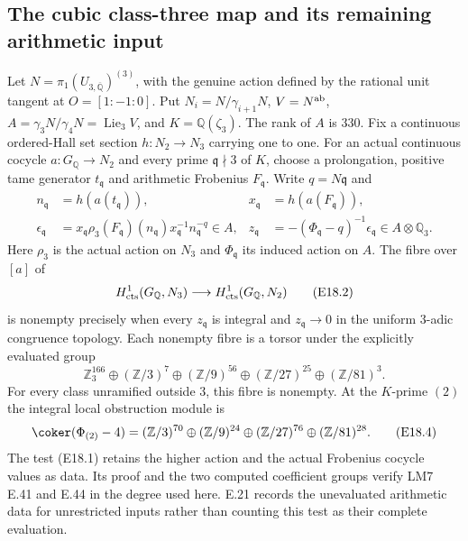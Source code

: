 \subsection{The cubic class-three map and its remaining arithmetic input}

\begin{proposition}
\label{E-class-three-criterion}
Let $N=\pi_1(U_{3,\overline{\mathbb Q}})^{(3)}$, with
the genuine action defined by the rational unit tangent
at $O=[1:-1:0]$. Put $N_i=N/\gamma_{i+1}N$,
$V=N^{\rm ab}$, $A=\gamma_3N/\gamma_4N=\operatorname{Lie}_3V$,
and $K=\mathbb Q(\zeta_3)$. The rank of $A$ is $330$.
Fix a continuous ordered-Hall set section $h:N_2\to N_3$
carrying one to one. For an actual continuous cocycle
$a:G_{\mathbb Q}\to N_2$ and every prime
$\mathfrak q\nmid3$ of $K$, choose a prolongation,
positive tame generator $t_{\mathfrak q}$ and arithmetic
Frobenius $F_{\mathfrak q}$. Write $q=N\mathfrak q$ and
\[
 \begin{aligned}
 n_{\mathfrak q}&=h(a(t_{\mathfrak q})),&
 x_{\mathfrak q}&=h(a(F_{\mathfrak q})),\\
 \epsilon_{\mathfrak q}
 &=x_{\mathfrak q}\rho_3(F_{\mathfrak q})(n_{\mathfrak q})
       x_{\mathfrak q}^{-1}n_{\mathfrak q}^{-q}\in A,&
 z_{\mathfrak q}
 &=-(\Phi_{\mathfrak q}-q)^{-1}\epsilon_{\mathfrak q}
       \in A\otimes\mathbb Q_3 .
 \end{aligned}
 \tag{E18.1}
\]
Here $\rho_3$ is the actual action on $N_3$ and
$\Phi_{\mathfrak q}$ its induced action on $A$.
The fibre over $[a]$ of
\[
 H^1_{\rm cts}(G_{\mathbb Q},N_3)
       \longrightarrow H^1_{\rm cts}(G_{\mathbb Q},N_2)
 \tag{E18.2}
\]
is nonempty precisely when every $z_{\mathfrak q}$ is
integral and $z_{\mathfrak q}\to0$ in the uniform
$3$-adic congruence topology. Each nonempty fibre is
a torsor under the explicitly evaluated group
\[
 \mathbb Z_3^{166}\oplus(\mathbb Z/3)^7
   \oplus(\mathbb Z/9)^{56}\oplus(\mathbb Z/27)^{25}
   \oplus(\mathbb Z/81)^3 .
 \tag{E18.3}
\]
For every class unramified outside $3$, this fibre
is nonempty. At the $K$-prime $(2)$ the integral
local obstruction module is
\[
 \coker(\Phi_{(2)}-4)=
 (\mathbb Z/3)^{70}\oplus(\mathbb Z/9)^{24}
 \oplus(\mathbb Z/27)^{76}\oplus(\mathbb Z/81)^{28}.
 \tag{E18.4}
\]
The test (E18.1) retains the higher action and the
actual Frobenius cocycle values as data. Its proof
and the two computed coefficient groups verify LM7
E.41 and E.44 in the degree used here. E.21 records
the unevaluated arithmetic data for unrestricted
inputs rather than counting this test as their
complete evaluation.
\end{proposition}
